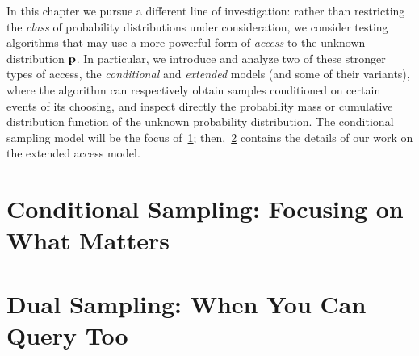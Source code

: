 In this chapter we pursue a different line of investigation: rather than restricting the \emph{class} of probability distributions under consideration, we consider testing algorithms that may use a more powerful form of \emph{access} to the unknown distribution $\mathbf{p}$. In particular, we introduce and analyze two of these stronger types of access, the \emph{conditional} and \emph{extended} models (and some of their variants), where the algorithm can respectively obtain samples conditioned on certain events of its choosing, and inspect directly the probability mass or cumulative distribution function of the unknown probability distribution. The conditional sampling model will be the focus of~\cref{sec:conditional}; then,~\cref{sec:extended} contains the details of our work on the extended access model.


\section{Conditional Sampling: Focusing on What Matters}\label{sec:conditional}


\section{Dual Sampling: When You Can Query Too}\label{sec:extended}


